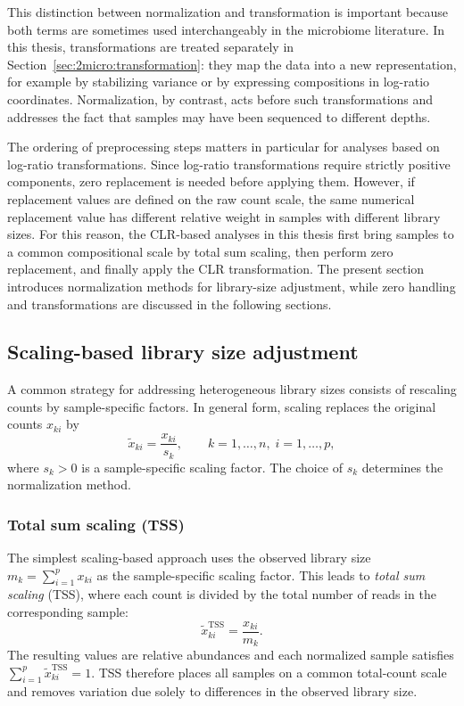 This distinction between normalization and transformation is important because both terms are sometimes used interchangeably in the microbiome literature. In this thesis, transformations are treated separately in Section~\ref{sec:2micro:transformation}: they map the data into a new representation, for example by stabilizing variance or by expressing compositions in log-ratio coordinates. Normalization, by contrast, acts before such transformations and addresses the fact that samples may have been sequenced to different depths.

The ordering of preprocessing steps matters in particular for analyses based on log-ratio transformations. Since log-ratio transformations require strictly positive components, zero replacement is needed before applying them. However, if replacement values are defined on the raw count scale, the same numerical replacement value has different relative weight in samples with different library sizes. For this reason, the CLR-based analyses in this thesis first bring samples to a common compositional scale by total sum scaling, then perform zero replacement, and finally apply the CLR transformation. The present section introduces normalization methods for library-size adjustment, while zero handling and transformations are discussed in the following sections.

\subsection{Scaling-based library size adjustment}
\label{sec:2micro:norm:scaling}

A common strategy for addressing heterogeneous library sizes consists of rescaling counts by sample-specific factors. 
In general form, scaling replaces the original counts $x_{ki}$ by
\begin{equation}
\tilde{x}_{ki} = \frac{x_{ki}}{s_k}, \qquad k=1,\dots,n,\;i=1,\dots,p,
\end{equation}
where $s_k>0$ is a sample-specific scaling factor. 
The choice of $s_k$ determines the normalization method.

\subsubsection*{Total sum scaling (TSS)}

The simplest scaling-based approach uses the observed library size $m_k=\sum_{i=1}^p x_{ki}$ as the sample-specific scaling factor. This leads to \emph{total sum scaling} (TSS), where each count is divided by the total number of reads in the corresponding sample:
\begin{equation}
\tilde{x}^{\mathrm{TSS}}_{ki} = \frac{x_{ki}}{m_k}.
\end{equation}
The resulting values are relative abundances and each normalized sample satisfies $\sum_{i=1}^p \tilde{x}^{\mathrm{TSS}}_{ki}=1$. TSS therefore places all samples on a common total-count scale and removes variation due solely to differences in the observed library size.

